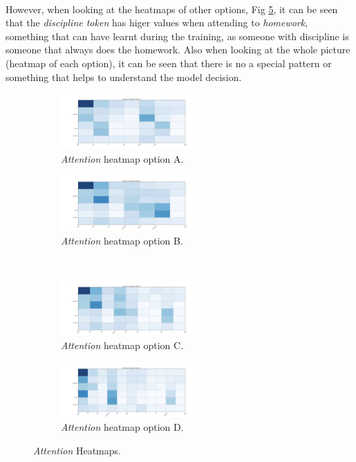 \paragraph{}
However, when looking at the heatmaps of other options, Fig \ref{fig:attention-heatmap-examples}, it can be seen that the \emph{discipline token} has higer values when attending to \emph{homework}, something that can have learnt during the training, as someone with discipline is someone that always does the homework. Also when looking at the whole picture (heatmap of each option), it can be seen that there is no a special pattern or something that helps to understand the model decision. 
\begin{figure}[h]
\centering
\begin{subfigure}{0.45\textwidth}
  \centering
	\includegraphics[width=200px]{images/attention_heatmap_0}
	\caption{\emph{Attention} heatmap option A.}
	\label{fig:att-hm-a}
\end{subfigure}
\begin{subfigure}{0.45\textwidth}
  \centering
	\includegraphics[width=200px]{images/attention_heatmap_1}
	\caption{\emph{Attention} heatmap option B.}
	\label{fig:att-hm-b}
\end{subfigure}
\medskip\\
\begin{subfigure}{0.45\textwidth}
  \centering
	\includegraphics[width=200px]{images/attention_heatmap_2}
	\caption{\emph{Attention} heatmap option C.}
	\label{fig:att-hm-c}
\end{subfigure}
\begin{subfigure}{0.45\textwidth}
  \centering
	\includegraphics[width=200px]{images/attention_heatmap_3}
	\caption{\emph{Attention} heatmap option D.}
	\label{fig:att-hm-d}
\end{subfigure}
\caption{\emph{Attention} Heatmaps.}
\label{fig:attention-heatmap-examples}
\end{figure}



